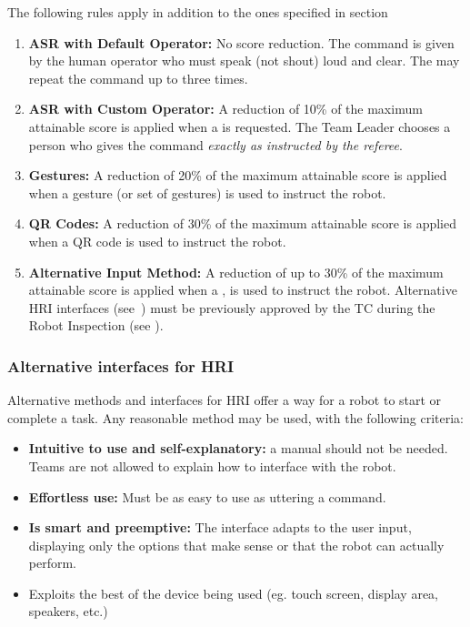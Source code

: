 The following rules apply in addition to the ones specified in section 
\begin{enumerate}
	\item \textbf{ASR with Default Operator:} No score reduction.
	The command is given by the human operator who must speak (not shout) loud and clear.
	The  may repeat the command up to three times.

	\item \textbf{ASR with Custom Operator:} A reduction of 10\% of the maximum attainable score is applied when a  is requested.
	The Team Leader chooses a person who gives the command \emph{exactly as instructed by the referee}.

	\item \textbf{Gestures:} A reduction of 20\% of the maximum attainable score is applied when a gesture (or set of gestures) is used to instruct the robot.

	\item \textbf{QR Codes:} A reduction of 30\% of the maximum attainable score is applied when a QR code is used to instruct the robot.

	\item \textbf{Alternative Input Method:} A reduction of up to 30\% of the maximum attainable score is applied when a , is used to instruct the robot.
	Alternative HRI interfaces (see~) must be previously approved by the TC during the Robot Inspection (see \Organisation).
\end{enumerate}


\subsubsection{Alternative interfaces for HRI}\label{rule:asralternative}
Alternative methods and interfaces for HRI offer a way for a robot to start or complete a task.
Any reasonable method may be used, with the following criteria:
\begin{itemize}
	\item \textbf{Intuitive to use and self-explanatory:} a manual should not be needed. Teams are not allowed to explain how to interface with the robot. %

	\item \textbf{Effortless use:} Must be as easy to use as uttering a command. %

	\item \textbf{Is smart and preemptive:} The interface adapts to the user input, displaying only the options that make sense or that the robot can actually perform.

	\item Exploits the best of the device being used (eg. touch screen, display area, speakers, etc.)
\end{itemize}

